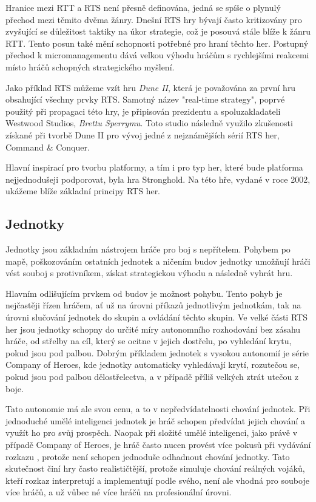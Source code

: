 Hranice mezi RTT a RTS není přesně definována, jedná se spíše o plynulý přechod mezi těmito dvěma žánry. Dnešní RTS hry bývají často kritizovány pro zvyšující se důležitost taktiky na úkor strategie, což je posouvá stále blíže k žánru RTT. Tento posun také mění schopnosti potřebné pro hraní těchto her. Postupný přechod k micromanagementu dává velkou výhodu hráčům s rychlejšími reakcemi místo hráčů schopných strategického myšlení.

Jako příklad RTS můžeme vzít hru \emph{Dune II}, která je považována za první hru obsahující všechny prvky RTS.\cite{} Samotný název "real-time strategy", poprvé použitý při propagaci této hry, je připisován prezidentu a spoluzakladateli Westwood Studios, \emph{Brettu Sperrymu}. Toto studio následně využilo zkušenosti získané při tvorbě Dune II pro vývoj jedné z nejznámějších sérií RTS her, Command \& Conquer.



Hlavní inspirací pro tvorbu platformy, a tím i pro typ her, které bude platforma nejjednodušeji podporovat, byla hra Stronghold. Na této hře, vydané v roce 2002, ukážeme blíže základní principy RTS her.

\subsection{Jednotky}
Jednotky jsou základním nástrojem hráče pro boj s nepřítelem. Pohybem po mapě, poškozováním ostatních jednotek a ničením budov jednotky umožňují hráči vést souboj s protivníkem, získat strategickou výhodu a následně vyhrát hru. 

Hlavním odlišujícím prvkem od budov je možnost pohybu. Tento pohyb je nejčastěji řízen hráčem, ať už na úrovni příkazů jednotlivým jednotkám, tak na úrovni slučování jednotek do skupin a ovládání těchto skupin. Ve velké části RTS her jsou jednotky schopny do určité míry autonomního rozhodování bez zásahu hráče, od střelby na cíl, který se ocitne v jejich dostřelu, po vyhledání krytu, pokud jsou pod palbou. Dobrým příkladem jednotek s vysokou autonomií je série Company of Heroes, kde jednotky automaticky vyhledávají krytí, rozutečou se, pokud jsou pod palbou dělostřelectva, a v případě příliš velkých ztrát utečou z boje. 

Tato autonomie má ale svou cenu, a to v nepředvídatelnosti chování jednotek. Při jednoduché umělé inteligenci jednotek je hráč schopen předvídat jejich chování a využít ho pro svůj prospěch. Naopak při složité umělé inteligenci, jako právě v případě Company of Heroes, je hráč často nucen provést více pokusů při vydávání rozkazu , protože není schopen jednoduše odhadnout chování jednotky. Tato skutečnost činí hry často realističtější, protože simuluje chování reálných vojáků, kteří rozkaz interpretují a implementují podle svého, není ale vhodná pro souboje více hráčů, a už vůbec né více hráčů na profesionální úrovni.

